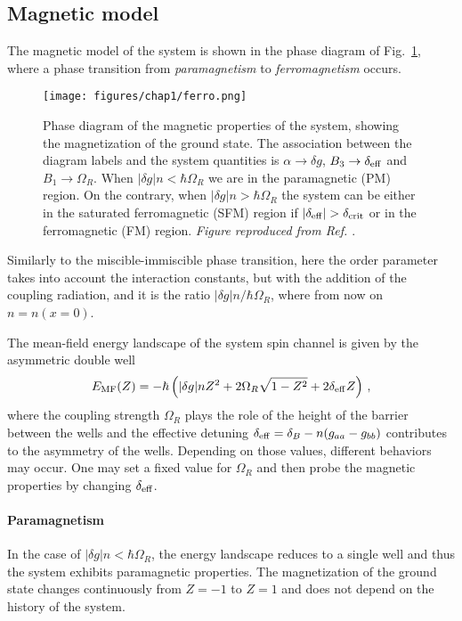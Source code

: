 \subsection{Magnetic model}
The magnetic model of the system is shown in the phase diagram of Fig.\ \ref{fig:ferro}, where a phase transition from \emph{paramagnetism} to \emph{ferromagnetism} occurs.
\begin{figure}[ht!]
    \centering
    \texttt{[image: figures/chap1/ferro.png]}
    \caption{Phase diagram of the magnetic properties of the system, showing the magnetization of the ground state. The association between the diagram labels and the system quantities is $\alpha\to \delta g$, $B_3 \to \delta_{\rm eff}$ and $B_1 \to \Omega_R$. When $|\delta g|n < \hbar\Omega_R$ we are in the paramagnetic (PM) region. On the contrary, when $|\delta g|n > \hbar\Omega_R$ the system can be either in the saturated ferromagnetic (SFM) region if $|\delta_{\rm eff}| > \delta_{\rm crit}$ or in the ferromagnetic (FM) region. \emph{Figure reproduced from Ref. \cite{cominotti2023ferro}}.}
    \label{fig:ferro}
\end{figure}
Similarly to the miscible-immiscible phase transition, here the order parameter takes into account the interaction constants, but with the addition of the coupling radiation, and it is the ratio $|\delta g|n/\hbar\Omega_R$, where from now on $n = n(x = 0)$.

The mean-field energy landscape of the system spin channel is given by the asymmetric double well
\begin{equation}
    E_{\rm MF}(Z) = -\hbar\left(|\delta g|n Z^2 + 2\Omega_R \sqrt{1-Z^2} + 2\delta_{\rm eff} Z\right)\, ,
    \label{eq:E_MF}
\end{equation}
where the coupling strength $\Omega_R$ plays the role of the height of the barrier between the wells and the effective detuning $\delta_{\rm eff} = \delta_B - n(g_{aa}-g_{bb})$ contributes to the asymmetry of the wells. Depending on those values, different behaviors may occur. One may set a fixed value for $\Omega_R$ and then probe the magnetic properties by changing $\delta_{\rm eff}$.

\paragraph{Paramagnetism}
In the case of $|\delta g|n < \hbar\Omega_R$, the energy landscape reduces to a single well and thus the system exhibits paramagnetic properties. The magnetization of the ground state changes continuously from $Z=-1$ to $Z=1$ and does not depend on the history of the system. 

